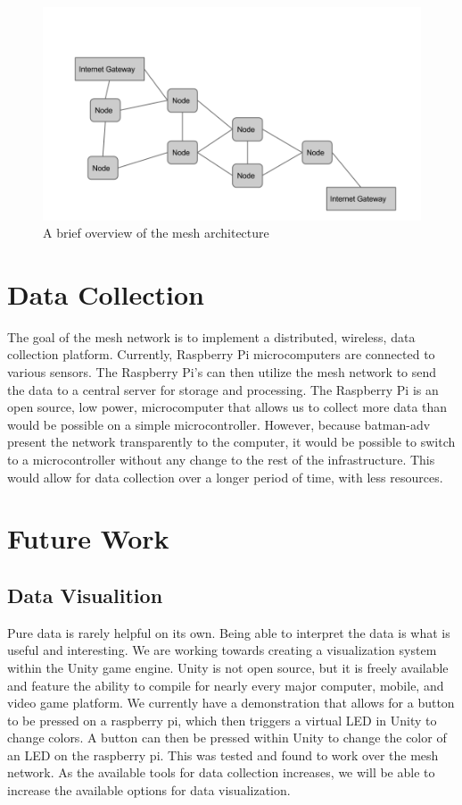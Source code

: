 \documentclass{IEEEtran}
\begin{document}
\begin{figure}
	\includegraphics[width=\textwidth]{nodearchitecture}
	\caption{A brief overview of the mesh architecture}
\end{figure}
\section{Data Collection}

The goal of the mesh network is to implement a distributed, wireless, data collection platform. Currently, Raspberry Pi microcomputers are connected to various sensors. The Raspberry Pi’s can then utilize the mesh network to send the data to a central server for storage and processing. The Raspberry Pi is an open source, low power, microcomputer that allows us to collect more data than would be possible on a simple microcontroller. However, because batman-adv present the network transparently to the computer, it would be possible to switch to a microcontroller without any change to the rest of the infrastructure. This would allow for data collection over a longer period of time, with less resources. 

\section{Future Work}
\subsection{Data Visualition}
	
	Pure data is rarely helpful on its own. Being able to interpret the data is what is useful and interesting. We are working towards creating a visualization system within the Unity game engine. Unity is not open source, but it is freely available and feature the ability to compile for nearly every major computer, mobile, and video game platform. We currently have a demonstration that allows for a button to be pressed on a raspberry pi, which then triggers a virtual LED in Unity to change colors. A button can then be pressed within Unity to change the color of an LED on the raspberry pi. This was tested and found to work over the mesh network. As the available tools for data collection increases, we will be able to increase the available options for data visualization. 
\end{document}
